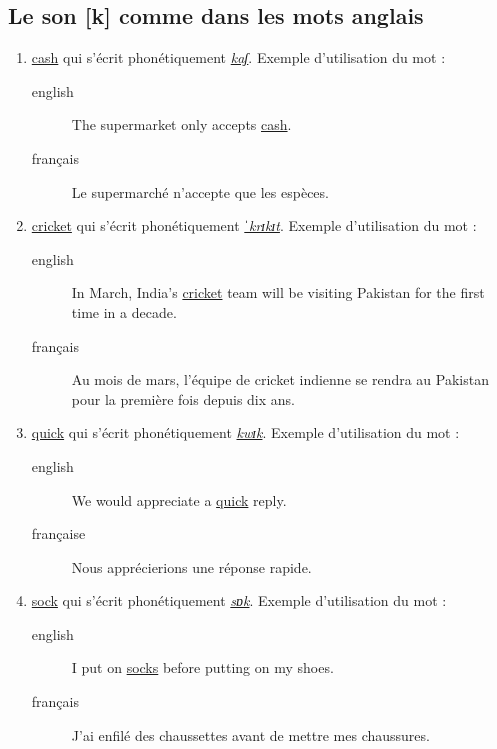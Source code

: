 \subsection{Le son [k] comme dans les mots anglais}
\label{sec:org5ed979e}
\begin{enumerate}
\item \href{http://www.wordreference.com/enfr/cash}{cash} qui s'écrit phonétiquement \href{https://en.oxforddictionaries.com/definition/cash}{\emph{kaʃ}}. Exemple d'utilisation du mot :
\begin{description}
\item[{english}] \textenglish{The supermarket only accepts \href{https://youtu.be/ALGi0tcFCcw}{cash}.}
\item[{français}] Le supermarché n'accepte que les espèces.
\end{description}
\item \href{http://www.wordreference.com/enfr/cricket}{cricket} qui s'écrit phonétiquement \href{https://en.oxforddictionaries.com/definition/cricket}{\emph{ˈkrɪkɪt}}. Exemple d'utilisation du mot :
\begin{description}
\item[{english}] \textenglish{In March, India's \href{https://youtu.be/c5oZPB-grGI}{cricket} team will be visiting
Pakistan for the first time in a decade.}
\item[{français}] Au mois de mars, l'équipe de cricket indienne se rendra au Pakistan pour la première fois depuis dix ans.
\end{description}
\item \href{http://www.wordreference.com/enfr/quick}{quick} qui s'écrit phonétiquement \href{https://en.oxforddictionaries.com/definition/quick}{\emph{kwɪk}}. Exemple d'utilisation du mot :
\begin{description}
\item[{english}] \textenglish{We would appreciate a \href{https://youtu.be/OB-YD47ddWI}{quick} reply.}
\item[{française}] Nous apprécierions une réponse rapide.
\end{description}
\item \href{http://www.wordreference.com/enfr/sock}{sock} qui s'écrit phonétiquement \href{https://en.oxforddictionaries.com/definition/sock}{\emph{sɒk}}. Exemple d'utilisation du mot :
\begin{description}
\item[{english}] \textenglish{I put on \href{https://youtu.be/Eu1fW2BafnM}{socks} before putting on my shoes.}
\item[{français}] J'ai enfilé des chaussettes avant de mettre mes
chaussures.
\end{description}
\end{enumerate}
